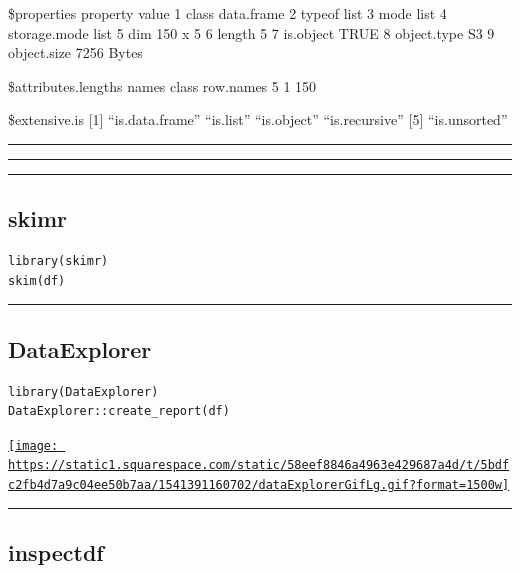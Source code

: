 \documentclass[]{article}
\begin{document}
\$properties property value 1 class data.frame 2 typeof list 3 mode list
4 storage.mode list 5 dim 150 x 5 6 length 5 7 is.object TRUE 8
object.type S3 9 object.size 7256 Bytes

\$attributes.lengths names class row.names 5 1 150

\$extensive.is {[}1{]} ``is.data.frame'' ``is.list'' ``is.object''
``is.recursive'' {[}5{]} ``is.unsorted''

\begin{center}\rule{0.5\linewidth}{\linethickness}\end{center}

\begin{center}\rule{0.5\linewidth}{\linethickness}\end{center}

\begin{center}\rule{0.5\linewidth}{\linethickness}\end{center}

\hypertarget{skimr}{%
\subsection{skimr}\label{skimr}}

\begin{verbatim}
library(skimr)
skim(df)
\end{verbatim}

\begin{center}\rule{0.5\linewidth}{\linethickness}\end{center}

\hypertarget{dataexplorer}{%
\subsection{DataExplorer}\label{dataexplorer}}

\begin{verbatim}
library(DataExplorer)
DataExplorer::create_report(df)
\end{verbatim}

\href{https://www.littlemissdata.com/blog/simple-eda}{\texttt{[image: https://static1.squarespace.com/static/58eef8846a4963e429687a4d/t/5bdfc2fb4d7a9c04ee50b7aa/1541391160702/dataExplorerGifLg.gif?format=1500w]}}

\begin{center}\rule{0.5\linewidth}{\linethickness}\end{center}

\hypertarget{inspectdf}{%
\subsection{inspectdf}\label{inspectdf}}
\end{document}
